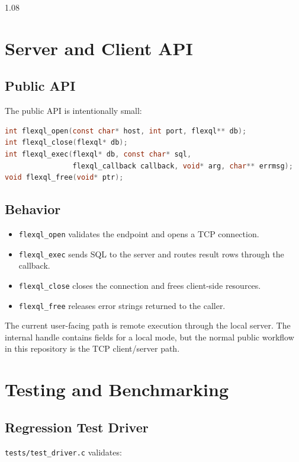 \documentclass[11pt,a4paper]{article}
\begin{document}
\begin{spacing}{1.08}
\section{Server and Client API}

\subsection{Public API}

The public API is intentionally small:

\begin{lstlisting}[language=C]
int flexql_open(const char* host, int port, flexql** db);
int flexql_close(flexql* db);
int flexql_exec(flexql* db, const char* sql,
                flexql_callback callback, void* arg, char** errmsg);
void flexql_free(void* ptr);
\end{lstlisting}

\subsection{Behavior}

\begin{itemize}
    \item \texttt{flexql\_open} validates the endpoint and opens a TCP connection.
    \item \texttt{flexql\_exec} sends SQL to the server and routes result rows through the callback.
    \item \texttt{flexql\_close} closes the connection and frees client-side resources.
    \item \texttt{flexql\_free} releases error strings returned to the caller.
\end{itemize}

The current user-facing path is remote execution through the local server. The internal handle contains fields for a local mode, but the normal public workflow in this repository is the TCP client/server path.

\section{Testing and Benchmarking}

\subsection{Regression Test Driver}

\texttt{tests/test\_driver.c} validates:


\end{spacing}
\end{document}
